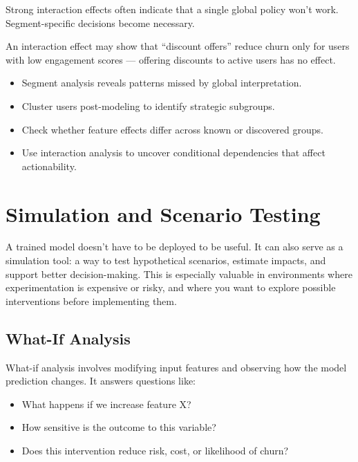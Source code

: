 \documentclass[12pt,openany]{book}
\begin{document}
\begin{notebox}
Strong interaction effects often indicate that a single global policy won't work. Segment-specific decisions become necessary.
\end{notebox}

\begin{examplebox}
An interaction effect may show that ``discount offers'' reduce churn only for users with low engagement scores — offering discounts to active users has no effect.
\end{examplebox}

\begin{summarybox}
\begin{itemize}
  \item Segment analysis reveals patterns missed by global interpretation.
  \item Cluster users post-modeling to identify strategic subgroups.
  \item Check whether feature effects differ across known or discovered groups.
  \item Use interaction analysis to uncover conditional dependencies that affect actionability.
\end{itemize}
\end{summarybox}




\chapter{Simulation and Scenario Testing}

A trained model doesn’t have to be deployed to be useful. It can also serve as a simulation tool: a way to test hypothetical scenarios, estimate impacts, and support better decision-making. This is especially valuable in environments where experimentation is expensive or risky, and where you want to explore possible interventions before implementing them.

\section{What-If Analysis}

What-if analysis involves modifying input features and observing how the model prediction changes. It answers questions like:
\begin{itemize}
  \item What happens if we increase feature X?
  \item How sensitive is the outcome to this variable?
  \item Does this intervention reduce risk, cost, or likelihood of churn?
\end{itemize}
\end{document}
